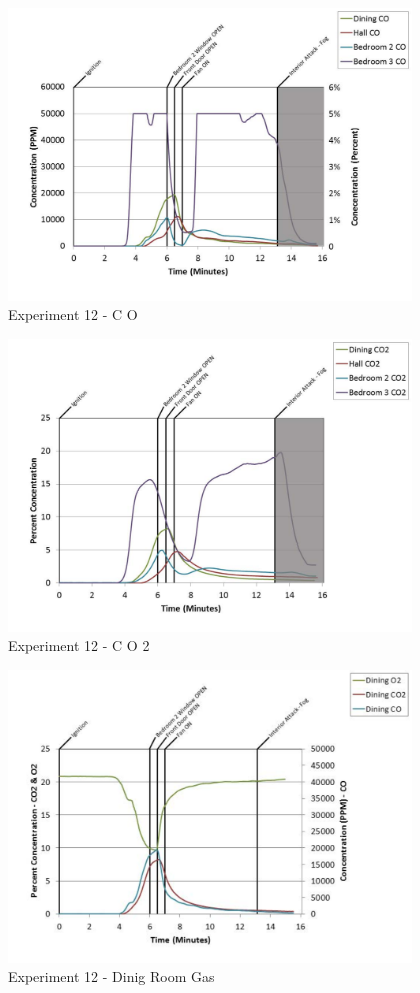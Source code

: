 \documentclass{article}
\begin{document}
\begin{appendices}
	\begin{figure}[h!]
		\centering
		\includegraphics[height=3.05in]{0_Images/Results_Charts/Exp_12_Charts/CO.pdf}
		\caption{Experiment 12 - C O}
	\end{figure}
 
	\clearpage

	\begin{figure}[h!]
		\centering
		\includegraphics[height=3.05in]{0_Images/Results_Charts/Exp_12_Charts/CO2.pdf}
		\caption{Experiment 12 - C O 2}
	\end{figure}
 

	\begin{figure}[h!]
		\centering
		\includegraphics[height=3.05in]{0_Images/Results_Charts/Exp_12_Charts/DinigRoomGas.pdf}
		\caption{Experiment 12 - Dinig Room Gas}
	\end{figure}
 

\end{appendices}
\end{document}
